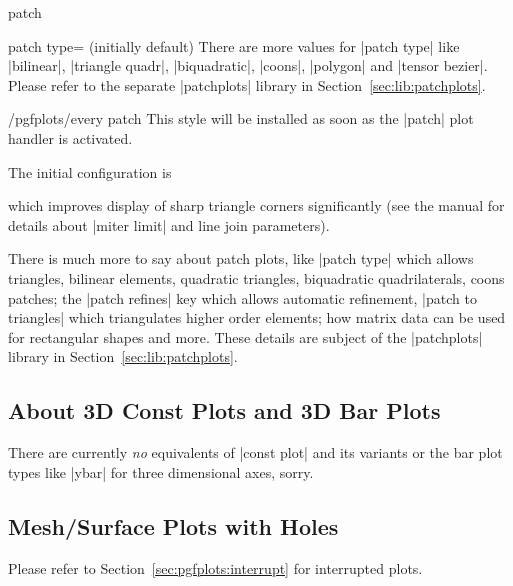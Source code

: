 {\begin{plottype}[/pgfplots]{patch}
\begin{pgfplotskey}{patch type= (initially default)}
        There are more values for |patch type| like |bilinear|,
        |triangle quadr|, |biquadratic|, |coons|, |polygon| and
        |tensor bezier|. Please refer to the separate |patchplots| library in
        Section~\ref{sec:lib:patchplots}.
    \end{pgfplotskey}

    \begin{stylekey}{/pgfplots/every patch}
        This style will be installed as soon as the |patch| plot handler is
        activated.

        The initial configuration is
\begin{codeexample}
\end{codeexample}
        \noindent which improves display of sharp triangle corners significantly
        (see the \Tikz{} manual for details about |miter limit| and line join
        parameters).
    \end{stylekey}

    There is much more to say about patch plots, like |patch type| which allows
    triangles, bilinear elements, quadratic triangles, biquadratic
    quadrilaterals, coons patches; the |patch refines| key which allows
    automatic refinement, |patch to triangles| which triangulates higher order
    elements; how matrix data can be used for rectangular shapes and more.
    These details are subject of the |patchplots| library in
    Section~\ref{sec:lib:patchplots}.
\end{plottype}


\subsection{About 3D Const Plots and 3D Bar Plots}

There are currently \emph{no} equivalents of |const plot| and its variants or
the bar plot types like |ybar| for three dimensional axes, sorry.


\subsection{Mesh/Surface Plots with Holes}

Please refer to Section~\ref{sec:pgfplots:interrupt} for interrupted plots.

}
